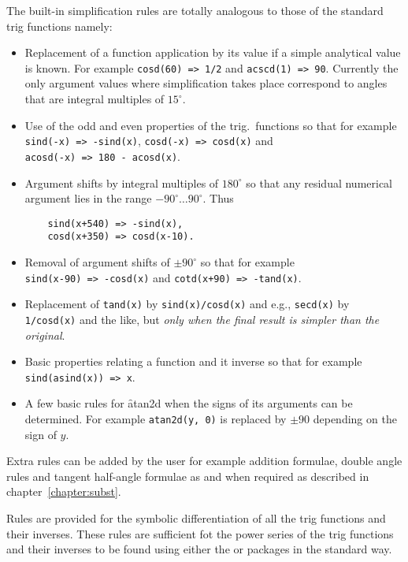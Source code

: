 The built-in simplification rules are totally analogous to those of the standard trig functions namely:
\begin{itemize}
\item  Replacement of a function application by its value if a simple analytical value is known. For example \texttt{cosd(60) => 1/2} and \texttt{acscd(1) => 90}. Currently the only argument values where simplification takes place correspond  to angles that are integral multiples of $15^\circ$.
\item Use of the odd and even properties of the trig.\ functions so that for example 
\texttt{sind(-x) => -sind(x)}, \texttt{cosd(-x) => cosd(x)}  and \\
\texttt{acosd(-x) => 180 - acosd(x)}. 
\item  Argument shifts by integral multiples of $180^\circ$ so that any residual numerical argument  lies in the range $-90^\circ \ldots  90^\circ$. Thus
  \begin{verbatim}
    sind(x+540) => -sind(x), 
    cosd(x+350) => cosd(x-10).
\end{verbatim}
\item  Removal of argument shifts of $\pm 90^\circ$ so that for example \\
 \texttt{sind(x-90) => -cosd(x)} and  \texttt{cotd(x+90) => -tand(x)}.
\item Replacement of \texttt{tand(x)} by \texttt{sind(x)/cosd(x)} and e.g., \texttt{secd(x)} by \texttt{1/cosd(x)} and the like, but \emph{only when the final result is simpler than the original}.
\item Basic properties relating a function and it inverse so that for example \\
\texttt{sind(asind(x)) => x}.
\item A few basic rules for \f{atan2d} when the signs of its arguments can be determined. For example \texttt{atan2d(y, 0)} is replaced by $\pm 90$ depending on the sign of $y$.
\end{itemize}

Extra rules can be added by the user for example addition formulae, double  angle rules and tangent half-angle formulae as and when required as described in chapter~\ref{chapter:subst}.

Rules are provided for the symbolic differentiation of all the trig  functions and their inverses.  These rules are sufficient fot the power series of the trig functions and their inverses to be found using either the  or  packages in the standard way.


